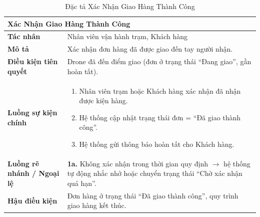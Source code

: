 \begin{table}[H]
  \centering
  \begin{tabularx}{\textwidth}{|l|X|}
    \hline
    \multicolumn{2}{|l|}{\textbf{Xác Nhận Giao Hàng Thành Công}} \\
    \hline
    \textbf{Tác nhân}           & Nhân viên vận hành trạm, Khách hàng \\ \hline
    \textbf{Mô tả}              & Xác nhận đơn hàng đã được giao đến tay người nhận. \\ \hline
    \textbf{Điều kiện tiên quyết} & Drone đã đến điểm giao (đơn ở trạng thái ``Đang giao'', gần hoàn tất). \\ \hline
    \textbf{Luồng sự kiện chính} &
      \begin{enumerate}[leftmargin=*, nosep, topsep=0pt]
        \item Nhân viên trạm hoặc Khách hàng xác nhận đã nhận được kiện hàng.
        \item Hệ thống cập nhật trạng thái đơn = ``Đã giao thành công''.
        \item Hệ thống gửi thông báo hoàn tất cho Khách hàng.
      \end{enumerate} \\ \hline
    \textbf{Luồng rẽ nhánh / Ngoại lệ} &
      \textbf{1a.} Không xác nhận trong thời gian quy định $\rightarrow$ hệ thống tự động nhắc nhở hoặc chuyển trạng thái ``Chờ xác nhận quá hạn''. \\ \hline
    \textbf{Hậu điều kiện}      & Đơn hàng ở trạng thái ``Đã giao thành công'', quy trình giao hàng kết thúc. \\
    \hline
  \end{tabularx}
  \caption{Đặc tả Xác Nhận Giao Hàng Thành Công}
  \label{tab:uc09}
\end{table}


